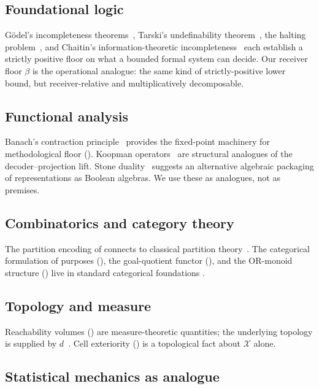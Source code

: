 \documentclass[11pt,a4paper]{article}
\newcommand{\X}{\mathcal{X}}
\begin{document}
\subsection{Foundational logic}

Gödel's incompleteness theorems~\cite{godel1931},
Tarski's undefinability theorem~\cite{tarski1933}, the halting
problem~\cite{turing1936,church1936}, and Chaitin's information-theoretic
incompleteness~\cite{chaitin1974} each establish a strictly positive
floor on what a bounded formal system can decide. Our receiver floor
$\beta$ is the operational analogue: the same kind of
strictly-positive lower bound, but receiver-relative and
multiplicatively decomposable.

\subsection{Functional analysis}

Banach's contraction principle~\cite{banach1922} provides the
fixed-point machinery for methodological floor ().
Koopman operators~\cite{koopman1931} are structural analogues of the
decoder--projection lift. Stone duality~\cite{stone1936} suggests an
alternative algebraic packaging of representations as Boolean
algebras. We use these as analogues, not as premises.

\subsection{Combinatorics and category theory}

The partition encoding of  connects to classical
partition theory~\cite{andrews1976,stanley2011}. The categorical
formulation of purposes (), the goal-quotient
functor (), and the OR-monoid structure
() live in standard categorical foundations
\cite{maclane1998,awodey2010,barrwells1990}.

\subsection{Topology and measure}

Reachability volumes () are measure-theoretic
quantities; the underlying topology is supplied by
$d$~\cite{kelley1955,munkres2000}. Cell exteriority
() is a topological fact about $\X$ alone.

\subsection{Statistical mechanics as analogue}
\end{document}
